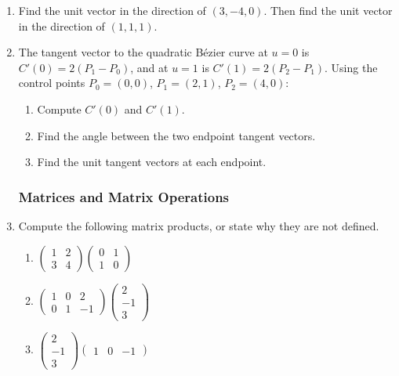 \begin{enumerate}
\item Find the unit vector in the direction of $(3, -4, 0)$.
Then find the unit vector in the direction of $(1, 1, 1)$.

\item The tangent vector to the quadratic B\'{e}zier curve at $u=0$ is
$C'(0) = 2(P_1 - P_0)$, and at $u=1$ is $C'(1) = 2(P_2 - P_1)$.
Using the control points $P_0 = (0,0)$, $P_1 = (2,1)$, $P_2 = (4,0)$:
\begin{enumerate}
  \item Compute $C'(0)$ and $C'(1)$.
  \item Find the angle between the two endpoint tangent vectors.
  \item Find the unit tangent vectors at each endpoint.
\end{enumerate}

\subsubsection*{Matrices and Matrix Operations}

\item Compute the following matrix products, or state why they are not defined.
\begin{enumerate}
  \item $\begin{pmatrix} 1 & 2 \\ 3 & 4 \end{pmatrix}
         \begin{pmatrix} 0 & 1 \\ 1 & 0 \end{pmatrix}$

  \item $\begin{pmatrix} 1 & 0 & 2 \\ 0 & 1 & -1 \end{pmatrix}
         \begin{pmatrix} 2 \\ -1 \\ 3 \end{pmatrix}$

  \item $\begin{pmatrix} 2 \\ -1 \\ 3 \end{pmatrix}
         \begin{pmatrix} 1 & 0 & -1 \end{pmatrix}$
\end{enumerate}


\end{enumerate}
